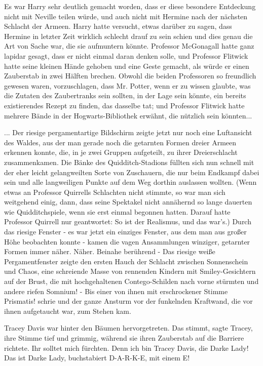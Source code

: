Es war Harry sehr deutlich gemacht worden, dass er diese besondere Entdeckung
nicht mit Neville teilen würde, und auch nicht mit Hermine nach der nächsten
Schlacht der Armeen. Harry hatte versucht, etwas darüber zu sagen, dass Hermine
in letzter Zeit wirklich schlecht drauf zu sein schien und dies genau die Art
von Sache war, die sie aufmuntern könnte. Professor McGonagall hatte ganz
lapidar gesagt, dass er nicht einmal daran denken solle, und Professor Flitwick
hatte seine kleinen Hände gehoben und eine Geste gemacht, als würde er einen
Zauberstab in zwei Hälften brechen. Obwohl die beiden Professoren so freundlich
gewesen waren, vorzuschlagen, dass Mr. Potter, wenn er zu wissen glaubte, was
die Zutaten des Zaubertranks sein sollten, in der Lage sein könnte, ein bereits
existierendes Rezept zu finden, das dasselbe tat; und Professor Flitwick hatte
mehrere Bände in der Hogwarts-Bibliothek erwähnt, die nützlich sein könnten...

... Der riesige pergamentartige Bildschirm zeigte jetzt nur noch eine
Luftansicht des Waldes, aus der man gerade noch die getarnten Formen dreier
Armeen erkennen konnte, die, in je zwei Gruppen aufgeteilt, zu ihrer
Dreierschlacht zusammenkamen. Die Bänke des Quidditch-Stadions füllten sich nun
schnell mit der eher leicht gelangweilten Sorte von Zuschauern, die nur beim
Endkampf dabei sein und alle langweiligen Punkte auf dem Weg dorthin auslassen
wollten. (Wenn etwas an Professor Quirrells Schlachten nicht stimmte, so war man
sich weitgehend einig, dann, dass seine Spektakel nicht annähernd so lange
dauerten wie Quidditchspiele, wenn sie erst einmal begonnen hatten. Darauf hatte
Professor Quirrell nur geantwortet: \glqq{}So ist der Realismus\grqq{}, und das
war's.) Durch das riesige Fenster - es war jetzt ein einziges Fenster, aus dem
man aus großer Höhe beobachten konnte - kamen die vagen Ansammlungen winziger,
getarnter Formen immer näher. Näher. Beinahe berührend - Das riesige weiße
Pergamentfenster zeigte den ersten Hauch der Schlacht zwischen Sonnenschein und
Chaos, eine schreiende Masse von rennenden Kindern mit Smiley-Gesichtern auf der
Brust, die mit hochgehaltenen Contego-Schilden nach vorne stürmten und andere
riefen \glqq{}Somnium!\grqq{} - Bis einer von ihnen mit erschrockener Stimme
\glqq{}Prismatis!\grqq{} schrie und der ganze Ansturm vor der funkelnden
Kraftwand, die vor ihnen aufgetaucht war, zum Stehen kam.

Tracey Davis war hinter den Bäumen hervorgetreten. \glqq{}Das stimmt\grqq{},
sagte Tracey, ihre Stimme tief und grimmig, während sie ihren Zauberstab auf die
Barriere richtete. \glqq{}Ihr solltet mich fürchten. Denn ich bin Tracey Davis,
die Darke Lady! Das ist Darke Lady, buchstabiert D-A-R-K-E, mit einem E!\grqq{}

